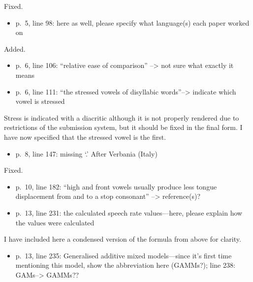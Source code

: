 \documentclass[]{article}
\providecommand{\tightlist}{%
  \setlength{\itemsep}{0pt}\setlength{\parskip}{0pt}}
\begin{document}
\color{plum}

Fixed. \color{black}

\begin{itemize}
\tightlist
\item
  p.~5, line 98: here as well, please specify what language(s) each
  paper worked on
\end{itemize}

\color{plum}

Added. \color{black}

\begin{itemize}
\item
  p.~6, line 106: ``relative ease of comparison'' --\textgreater{} not
  sure what exactly it means
\item
  p.~6, line 111: ``the stressed vowels of disyllabic
  words''--\textgreater{} indicate which vowel is stressed
\end{itemize}

\color{plum}

Stress is indicated with a diacritic although it is not properly
rendered due to restrictions of the submission system, but it should be
fixed in the final form. I have now specified that the stressed vowel is
the first. \color{black}

\begin{itemize}
\tightlist
\item
  p.~8, line 147: missing `.' After Verbania (Italy)
\end{itemize}

\color{plum}

Fixed. \color{black}

\begin{itemize}
\item
  p.~10, line 182: ``high and front vowels usually produce less tongue
  displacement from and to a stop consonant'' --\textgreater{}
  reference(s)?
\item
  p.~13, line 231: the calculated speech rate values---here, please
  explain how the values were calculated
\end{itemize}

\color{plum}

I have included here a condensed version of the formula from above for
clarity. \color{black}

\begin{itemize}
\tightlist
\item
  p.~13, line 235: Generalised additive mixed models---since it's first
  time mentioning this model, show the abbreviation here (GAMMs?); line
  238: GAMs--\textgreater{} GAMMs??
\end{itemize}
\end{document}
